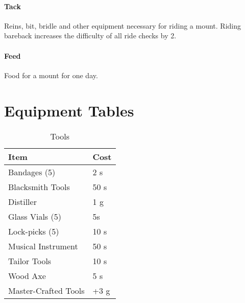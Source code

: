 \subsubsection*{Tack}
Reins, bit, bridle and other equipment necessary for riding a mount. Riding bareback increases the difficulty of all ride checks by 2.

\subsubsection*{Feed}
Food for a mount for one day.

\chapter{Equipment Tables}
\begin{table}[ht]
	\centering
	\caption{Tools}
	\begin{tabular}{|l|l|}
		\hline
		Item & Cost\\ [0.5ex]
		\hline
		Bandages (5)& 2 s\\
		Blacksmith Tools & 50 s\\
		Distiller & 1 g\\
		Glass Vials (5)& 5s\\
		Lock-picks (5) & 10 s\\
		Musical Instrument & 50 s\\
		Tailor Tools & 10 s\\
		Wood Axe & 5 s\\		
		\hline
		Master-Crafted Tools & +3 g\\
		\hline
	\end{tabular}
\end{table}

